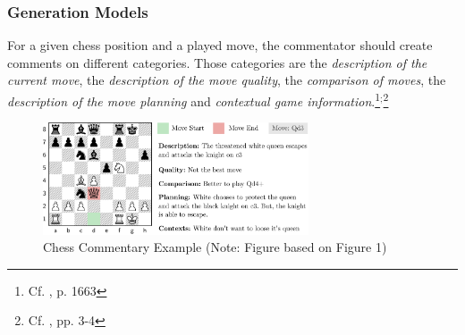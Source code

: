\subsubsection{Generation Models}

For a given chess position and a played move, the commentator should create comments on different categories. Those categories are the \textit{description of the current move}, the \textit{description of the move quality}, the \textit{comparison of moves}, the \textit{description of the move planning} and \textit{contextual game information}.\footnote{Cf. \cite{jhamtani-etal-2018-learning}, p. 1663}$^{;}$\footnote{Cf. \cite{zang-etal-2019-automated}, pp. 3-4}

\begin{figure}[h]
\centering
\includegraphics[width=0.7\textwidth]{graphics/commentator_example/commentator.png}
\caption{Chess Commentary Example (Note: Figure based on \cite{zang-etal-2019-automated} Figure 1)}
\end{figure}

